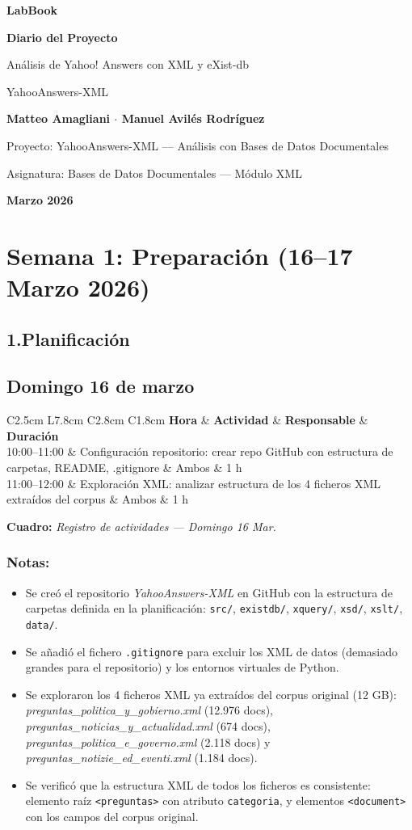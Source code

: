 \documentclass[11pt,a4paper]{article}
\newcommand{\notetitle}[1]{\subsubsection*{#1}}
\newcommand{\makecover}{%
  \thispagestyle{empty}
  \vspace*{3cm}
  {\fontsize{42}{46}\selectfont\rmfamily\bfseries\color{darkred}LabBook\par}
  \vspace{0.3cm}
  {\large\sffamily\bfseries Diario del Proyecto\par}
  \vspace{0.2cm}
  {\large\rmfamily\color{titlegray}Análisis de Yahoo! Answers con XML y eXist-db\par}
  \vspace{0.1cm}
  {\large\rmfamily\color{titlegray}YahooAnswers-XML\par}
  \vspace{1.5cm}
  {\normalsize\rmfamily\bfseries Matteo Amagliani $\cdot$ Manuel Avilés Rodríguez\par}
  \vspace{0.8cm}
  {\normalsize\rmfamily Proyecto: YahooAnswers-XML --- Análisis con Bases de Datos Documentales\par}
  {\normalsize\rmfamily Asignatura: Bases de Datos Documentales --- Módulo XML\par}
  \vspace{0.3cm}
  {\large\rmfamily\bfseries\color{darkred}Marzo 2026\par}
  \newpage
}
\newcommand{\activitytable}[2]{%
  \begin{center}
  \begin{tabular}{C{2.5cm} L{7.8cm} C{2.8cm} C{1.8cm}}
  \toprule
  \rowcolor{white}
  \textbf{Hora} & \textbf{Actividad} & \textbf{Responsable} & \textbf{Duración} \\
  \midrule
  #1
  \bottomrule
  \end{tabular}
  \end{center}
  \vspace{-4pt}
  {\small\textbf{Cuadro:} \textit{#2}}
  \vspace{6pt}
}
\begin{document}
\makecover

\tableofcontents
\newpage

\section{Semana 1: Preparación (16--17 Marzo 2026)}

\subsection*{1.\quad Planificación}

\subsection{Domingo 16 de marzo}

\activitytable{%
  10:00--11:00 & Configuración repositorio: crear repo GitHub con estructura de carpetas, README, .gitignore & Ambos & 1 h \\
  \rowcolor{tablegray}
  11:00--12:00 & Exploración XML: analizar estructura de los 4 ficheros XML extraídos del corpus & Ambos & 1 h \\
}{Registro de actividades --- Domingo 16 Mar.}

\notetitle{Notas:}
\begin{itemize}
  \item Se creó el repositorio \textit{YahooAnswers-XML} en GitHub con la estructura de carpetas definida en la planificación: \texttt{src/}, \texttt{existdb/}, \texttt{xquery/}, \texttt{xsd/}, \texttt{xslt/}, \texttt{data/}.
  \item Se añadió el fichero \texttt{.gitignore} para excluir los XML de datos (demasiado grandes para el repositorio) y los entornos virtuales de Python.
  \item Se exploraron los 4 ficheros XML ya extraídos del corpus original (12 GB): \textit{preguntas\_politica\_y\_gobierno.xml} (12.976 docs), \textit{preguntas\_noticias\_y\_actualidad.xml} (674 docs), \textit{preguntas\_politica\_e\_governo.xml} (2.118 docs) y \textit{preguntas\_notizie\_ed\_eventi.xml} (1.184 docs).
  \item Se verificó que la estructura XML de todos los ficheros es consistente: elemento raíz \texttt{<preguntas>} con atributo \texttt{categoria}, y elementos \texttt{<document>} con los campos del corpus original.
\end{itemize}
\end{document}

